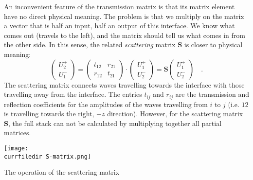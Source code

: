 An inconvenient feature of the transmission matrix is that its matrix element have no direct physical meaning. The problem is that we multiply on the matrix a vector that is half an input, half an output of this interface. We know what comes out (travels to the left), and the matrix should tell us what comes in from the other side. In this sense, the related \emph{scattering} matrix $\mathbf{S}$ is closer to physical meaning:
\begin{equation}
\begin{pmatrix}
U_2^+ \\ U_1^-
\end{pmatrix}
= 
\begin{pmatrix}
t_{12} & r_{21}  \\ r_{12} & t_{21}
\end{pmatrix}
\cdot
\begin{pmatrix}
U_1^+ \\ U_2^-
\end{pmatrix}
%
= \mathbf{S}
\begin{pmatrix}
U_1^+ \\ U_2^-
\end{pmatrix} \quad . 
\end{equation}
The scattering matrix connects waves travelling towards the interface with those travelling away from the interface. The entries $t_{ij}$ and $r_{ij}$ are the transmission and reflection coefficients for the amplitudes of the waves travelling from $i$ to $j$ (i.e. $12$ is travelling towards the right, $+z$ direction). However, for the scattering matrix $\mathbf{S}$, the full stack can not be calculated by multiplying together all partial matrices.

\begin{marginfigure}
\texttt{[image: \\currfiledir S-matrix.png]}

\caption{The operation of the scattering matrix
\label{fig:surface_S_matrix}}
\end{marginfigure}

